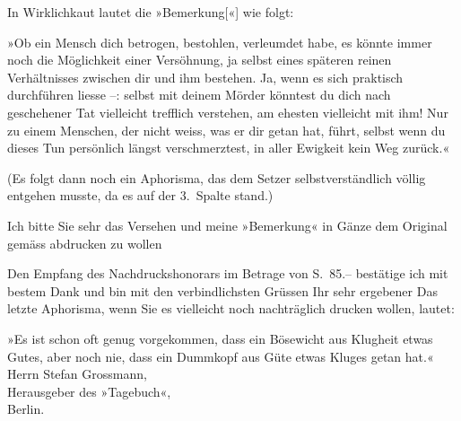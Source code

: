 \pstart
           In Wirklichkaut lautet die »Bemerkung{[}«{]} wie folgt:\pend
           
\pstart
           »Ob ein Mensch dich betrogen, bestohlen, 
               verleumdet habe, es könnte immer noch die Möglichkeit einer Versöhnung, ja selbst
               eines späteren reinen Verhältnisses zwischen dir und ihm bestehen. Ja, wenn es sich
               praktisch durchführen liesse –: selbst mit deinem
               Mörder könntest du dich nach geschehener Tat vielleicht trefflich verstehen, am
               ehesten vielleicht mit ihm! Nur {\pb}zu einem Menschen, der
               nicht weiss, was er dir getan hat, führt, selbst wenn du dieses Tun persönlich längst
               verschmerztest, in aller Ewigkeit kein Weg zurück.«\pend
           
\pstart
           (Es folgt dann noch ein Aphorisma, das dem Setzer selbstverständlich völlig entgehen
               musste, da es auf der 3. Spalte stand.)\pend
           
\pstart
           Ich bitte Sie sehr das Versehen \label{K_L02476-1v}\label{K_L02476-1} und meine »Bemerkung« in Gänze dem Original gemäss abdrucken zu
               wollen\pend
           
\pstart
           Den Empfang des Nachdruckshonorars im Betrage von S. 85.– bestätige ich mit bestem
               Dank und bin mit den verbindlichsten Grüssen\pend
           \pstart Ihr sehr ergebener\pend{}{\vspace{1\baselineskip}}
\pstart
           Das letzte Aphorisma, wenn Sie es vielleicht noch nachträglich drucken wollen,
                  lautet:\pend
           
\pstart
           »Es ist schon oft genug vorgekommen, dass ein Bösewicht aus Klugheit etwas Gutes,
                  aber noch nie, dass ein Dummkopf aus Güte etwas Kluges getan hat.«\pend
           {\vspace{1\baselineskip}}
\pstart
           Herrn Stefan Grossmann,{\\}Herausgeber des »Tagebuch«,{\\}Berlin.\pend
           \endnumbering{}  
      